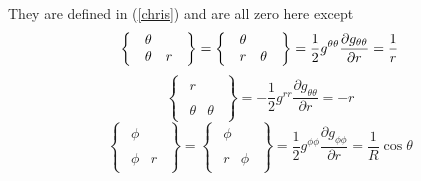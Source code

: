They are defined in (\ref{chris}) and are all zero here except 
\begin{equation}
\left\{ 
\begin{array}{l}
\begin{array}{ll}
\theta & \ 
\end{array}
\\ 
\begin{array}{ll}
\theta & r%
\end{array}%
\end{array}%
\right\} =\left\{ 
\begin{array}{l}
\begin{array}{ll}
\theta & \ 
\end{array}
\\ 
\begin{array}{ll}
r & \theta%
\end{array}%
\end{array}%
\right\} =\frac{1}{2}g^{\theta \theta }\frac{\partial g_{\theta \theta }}{%
\partial r}=\frac{1}{r}
\end{equation}%
\begin{equation}
\left\{ 
\begin{array}{l}
\begin{array}{ll}
r & \ 
\end{array}
\\ 
\begin{array}{ll}
\theta & \theta%
\end{array}%
\end{array}%
\right\} =-\frac{1}{2}g^{rr}\frac{\partial g_{\theta \theta }}{\partial r}=-r
\end{equation}%
\begin{equation}
\left\{ 
\begin{array}{l}
\begin{array}{ll}
\phi & \ 
\end{array}
\\ 
\begin{array}{ll}
\phi & r%
\end{array}%
\end{array}%
\right\} =\left\{ 
\begin{array}{l}
\begin{array}{ll}
\phi & \ 
\end{array}
\\ 
\begin{array}{ll}
r & \phi%
\end{array}%
\end{array}%
\right\} =\frac{1}{2}g^{\phi \phi }\frac{\partial g_{\phi \phi }}{\partial r}%
=\frac{1}{R}\cos \theta
\end{equation}%
